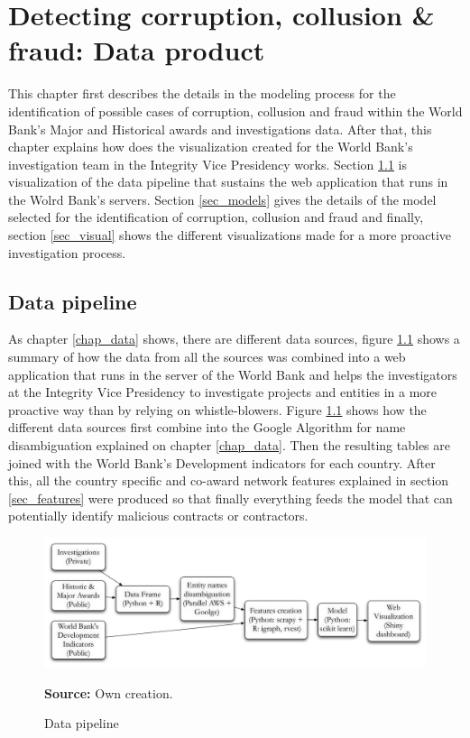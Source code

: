 \chapter{Detecting corruption, collusion \& fraud: Data product}\label{chap_product}


This chapter first describes the details in the modeling process for the identification of possible cases of corruption, collusion and fraud within the World Bank's Major and Historical awards and investigations data. After that, this chapter explains  how does the visualization created for the World Bank's investigation team in the Integrity Vice Presidency works. Section \ref{sec_pipeline} is visualization of the data pipeline that sustains the web application that runs in the Wolrd Bank's servers. Section \ref{sec_models} gives the details of the model selected for the identification of corruption, collusion and fraud and finally, section \ref{sec_visual} shows the different visualizations made for a more proactive investigation process.

\section{Data pipeline} \label{sec_pipeline}

As chapter \ref{chap_data} shows, there are different data sources, figure \ref{fig_pipeline} shows a summary of how the data from all the sources was combined into a web application that runs in the server of the World Bank and helps the investigators at the Integrity Vice Presidency to investigate projects and entities in a more proactive way than by relying on whistle-blowers. Figure \ref{fig_pipeline} shows how the different data sources first combine into the Google Algorithm for name disambiguation explained on chapter \ref{chap_data}. Then the resulting tables are joined with the World Bank's Development indicators for each country. After this, all the country specific and co-award network features explained in section \ref{sec_features} were produced so that finally everything feeds the model that can potentially identify malicious contracts or contractors.

\begin{figure}[H]
\begin{center}
\caption{Data pipeline}
\label{fig_pipeline}
\includegraphics[width=\textwidth,height=1\textheight,keepaspectratio]{../img/pipeline.pdf}
\end{center}
\noindent \footnotesize{\textbf{Source:} Own creation.}
\end{figure}

